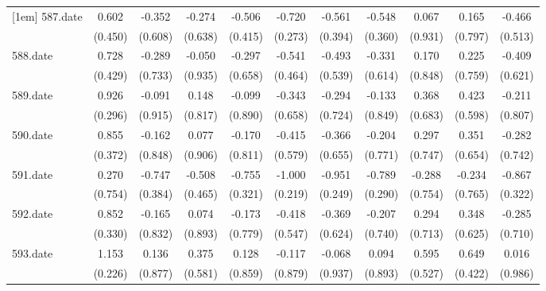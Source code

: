 \begin{tabular}{l*{10}{c}}
[1em]
587.date    &       0.602&      -0.352&      -0.274&      -0.506&      -0.720&      -0.561&      -0.548&       0.067&       0.165&      -0.466\\
            &     (0.450)&     (0.608)&     (0.638)&     (0.415)&     (0.273)&     (0.394)&     (0.360)&     (0.931)&     (0.797)&     (0.513)\\
[1em]
588.date    &       0.728&      -0.289&      -0.050&      -0.297&      -0.541&      -0.493&      -0.331&       0.170&       0.225&      -0.409\\
            &     (0.429)&     (0.733)&     (0.935)&     (0.658)&     (0.464)&     (0.539)&     (0.614)&     (0.848)&     (0.759)&     (0.621)\\
[1em]
589.date    &       0.926&      -0.091&       0.148&      -0.099&      -0.343&      -0.294&      -0.133&       0.368&       0.423&      -0.211\\
            &     (0.296)&     (0.915)&     (0.817)&     (0.890)&     (0.658)&     (0.724)&     (0.849)&     (0.683)&     (0.598)&     (0.807)\\
[1em]
590.date    &       0.855&      -0.162&       0.077&      -0.170&      -0.415&      -0.366&      -0.204&       0.297&       0.351&      -0.282\\
            &     (0.372)&     (0.848)&     (0.906)&     (0.811)&     (0.579)&     (0.655)&     (0.771)&     (0.747)&     (0.654)&     (0.742)\\
[1em]
591.date    &       0.270&      -0.747&      -0.508&      -0.755&      -1.000&      -0.951&      -0.789&      -0.288&      -0.234&      -0.867\\
            &     (0.754)&     (0.384)&     (0.465)&     (0.321)&     (0.219)&     (0.249)&     (0.290)&     (0.754)&     (0.765)&     (0.322)\\
[1em]
592.date    &       0.852&      -0.165&       0.074&      -0.173&      -0.418&      -0.369&      -0.207&       0.294&       0.348&      -0.285\\
            &     (0.330)&     (0.832)&     (0.893)&     (0.779)&     (0.547)&     (0.624)&     (0.740)&     (0.713)&     (0.625)&     (0.710)\\
[1em]
593.date    &       1.153&       0.136&       0.375&       0.128&      -0.117&      -0.068&       0.094&       0.595&       0.649&       0.016\\
            &     (0.226)&     (0.877)&     (0.581)&     (0.859)&     (0.879)&     (0.937)&     (0.893)&     (0.527)&     (0.422)&     (0.986)\\

\end{tabular}
